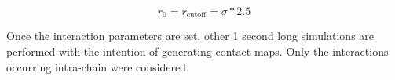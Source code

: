 $$
r_0 = r_{\text{cutoff}} = \sigma * 2.5
$$


Once the interaction parameters are set, other 1 second long simulations are performed with the intention of generating contact maps. Only the interactions occurring intra-chain were considered. 






